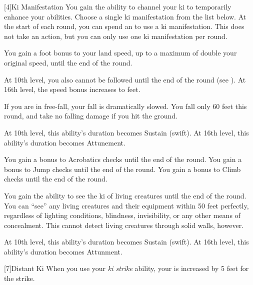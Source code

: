        [4]{Ki Manifestation}
        You gain the ability to channel your ki to temporarily enhance your abilities.
        Choose a single ki manifestation from the list below.
        At the start of each round, you can spend an  to use a ki manifestation.
        This does not take an action, but you can only use one ki manifestation per round.
        {
            You gain a  foot bonus to your land speed, up to a maximum of double your original speed, until the end of the round.

            At 10th level, you also cannot be followed until the end of the round (see ).
            At 16th level, the speed bonus increases to  feet.

            If you are in free-fall, your fall is dramatically slowed.
            You fall only 60 feet this round, and take no falling damage if you hit the ground.

            At 10th level, this ability's duration becomes Sustain (swift).
            At 16th level, this ability's duration becomes Attunement.

            You gain a  bonus to Acrobatics checks until the end of the round.
            You gain a  bonus to Jump checks until the end of the round.
            You gain a  bonus to Climb checks until the end of the round.

            You gain the ability to see the ki of living creatures until the end of the round.
            You can ``see'' any living creatures and their equipment within 50 feet perfectly, regardless of lighting conditions, blindness, invisibility, or any other means of concealment.
            This cannot detect living creatures through solid walls, however.

            At 10th level, this ability's duration becomes Sustain (swift).
            At 16th level, this ability's duration becomes Attunment.
        }

        [7]{Distant Ki} When you use your \textit{ki strike} ability, your  is increased by 5 feet for the strike.

